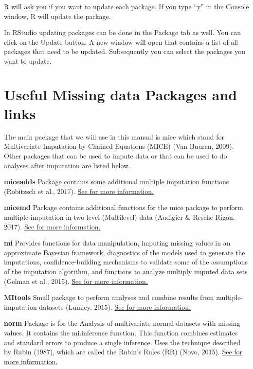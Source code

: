 \documentclass[
]{book}
\begin{document}
R will ask you if you want to update each package. If you type ``y'' in
the Console window, R will update the package.

In RStudio updating packages can be done in the Package tab as well. You
can click on the Update button. A new window will open that contains a
list of all packages that need to be updated. Subsequently you can
select the packages you want to update.

\hypertarget{useful-missing-data-packages-and-links}{%
\section{Useful Missing data Packages and
links}\label{useful-missing-data-packages-and-links}}

The main package that we will use in this manual is mice which stand for
Multivariate Imputation by Chained Equations (MICE) (Van Buuren, 2009).
Other packages that can be used to impute data or that can be used to do
analyses after imputation are listed below.

\textbf{miceadds} Package contains some additional multiple imputation
functions (Robitzsch et al., 2017).
\href{https://cran.r-project.org/web/packages/miceadds/index.html}{See
for more information.}

\textbf{micemd} Package contains additional functions for the mice
package to perform multiple imputation in two-level (Multilevel) data
(Audigier \& Resche-Rigon, 2017).
\href{https://cran.r-project.org/web/packages/micemd/index.html}{See for
more information.}

\textbf{mi} Provides functions for data manipulation, imputing missing
values in an approximate Bayesian framework, diagnostics of the models
used to generate the imputations, confidence-building mechanisms to
validate some of the assumptions of the imputation algorithm, and
functions to analyze multiply imputed data sets (Gelman et al., 2015).
\href{https://cran.r-project.org/web/packages/mi/index.html}{See for
more information.}

\textbf{MItools} Small package to perform analyses and combine results
from multiple-imputation datasets (Lumley, 2015).
\href{https://cran.r-project.org/web/packages/mitools/index.html}{See
for more information.}

\textbf{norm} Package is for the Analysis of multivariate normal
datasets with missing values. It contains the mi.inference function.
This function combines estimates and standard errors to produce a single
inference. Uses the technique described by Rubin (1987), which are
called the Rubin's Rules (RR) (Novo, 2015).
\href{https://cran.r-project.org/web/packages/norm/index.html}{See for
more information.}
\end{document}
